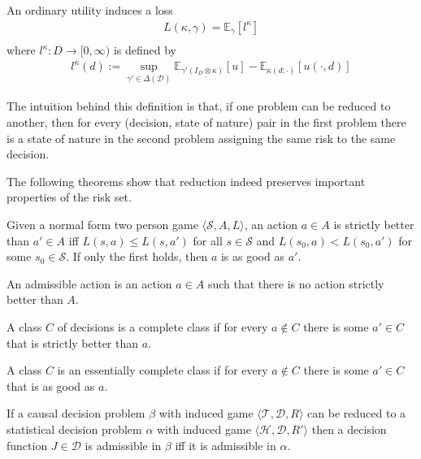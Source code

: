 \begin{definition}
An ordinary utility induces a loss
\begin{align}
    L(\kappa,\gamma) = \mathbb{E}_{\gamma}[l^\kappa]\\
\end{align}
where $l^\kappa:D\to [0,\infty)$ is defined by
\begin{align}
    l^\kappa(d) := \sup_{\gamma'\in \Delta(\mathcal{D})} \mathbb{E}_{\gamma'\underline{(I_D\otimes \kappa)}}[u] - \mathbb{E}_{\kappa(d;\cdot)}[u(\cdot,d)]\label{eq:induced_l}
\end{align}
\end{definition}


The intuition behind this definition is that, if one problem can be reduced to another, then for every (decision, state of nature) pair in the first problem there is a state of nature in the second problem assigning the same risk to the same decision.

The following theorems show that reduction indeed preserves important properties of the risk set.

\begin{definition}
Given a normal form two person game $\langle \mathscr{S}, A, L\rangle$, an action $a\in A$ is strictly better than $a'\in A$ iff $L(s,a)\leq L(s,a')$ for all $s\in\mathscr{S}$ and $L(s_0,a)<L(s_0,a')$ for some $s_0\in \mathscr{S}$. If only the first holds, then $a$ is as good as $a'$.

An admissible action is an action $a\in A$ such that there is no action strictly better than $A$.
\end{definition}

\begin{definition}
A class $C$ of decisions is a complete class if for every $a\not\in C$ there is some $a'\in C$ that is strictly better than $a$.

A class $C$ is an essentially complete class if for every $a\not\in C$ there is some $a'\in C$ that is as good as $a$.
\end{definition}

\begin{lemma}\label{lem:red_adm}
If a causal decision problem $\beta$ with induced game $\langle \mathscr{T},\mathscr{D}, R\rangle$ can be reduced to a statistical decision problem $\alpha$ with induced game $\langle \mathscr{H},\mathscr{D},R' \rangle$ then a decision function $J\in \mathscr{D}$ is admissible in $\beta$ iff it is admissible in $\alpha$.
\end{lemma}


